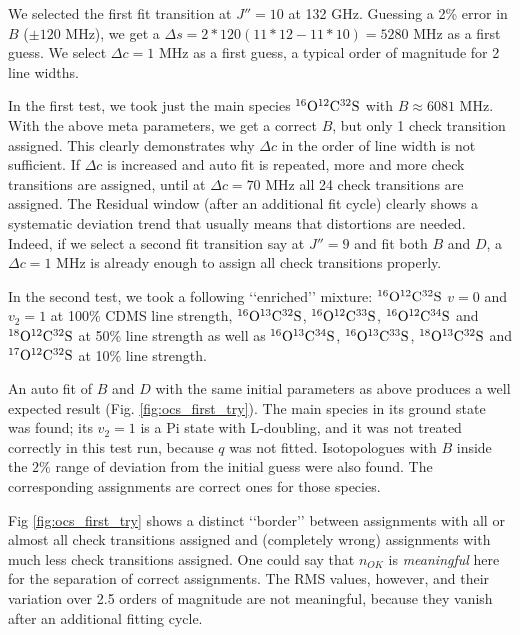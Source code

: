 \documentclass[11pt]{article}
\begin{document}
We selected the first fit transition at $J'' = 10$ at 132 GHz. Guessing a 2\% error in $B$ ($\pm 120$ MHz), we get a $\Delta s = 2*120(11*12 - 11*10) = 5280$ MHz as a first guess. We select $\Delta c = 1$ MHz as a first guess, a typical order of magnitude for 2 line widths.

In the first test, we took just the main species $\rm ^{16}O^{12}C^{32}S$ with $B \approx 6081$ MHz. With the above meta parameters, we get a correct $B$, but only 1 check transition assigned. This clearly demonstrates why $\Delta c$ in the order of line width is not sufficient. If $\Delta c$ is increased and auto fit is repeated, more and more check transitions are assigned, until at $\Delta c = 70$ MHz all 24 check transitions are assigned. The Residual window (after an additional fit cycle) clearly shows a systematic deviation trend that usually means that distortions are needed. Indeed, if we select a second fit transition say at $J'' = 9$ and fit both $B$ and $D$, a $\Delta c = 1$ MHz is already enough to assign all check transitions properly.

In the second test, we took a following \lq\lq{}enriched\rq\rq{} mixture: $\rm ^{16}O^{12}C^{32}S$ $v = 0$ and $v_2 = 1$ at 100\% CDMS line strength, 
$\rm ^{16}O^{13}C^{32}S$, $\rm ^{16}O^{12}C^{33}S$, $\rm ^{16}O^{12}C^{34}S$ and $\rm ^{18}O^{12}C^{32}S$ at 50\% line strength as well as $\rm ^{16}O^{13}C^{34}S$, $\rm ^{16}O^{13}C^{33}S$, $\rm ^{18}O^{13}C^{32}S$ and $\rm ^{17}O^{12}C^{32}S$ at 10\% line strength. 

An auto fit of $B$ and $D$ with the same initial parameters as above produces a well expected result (Fig. \ref{fig:ocs_first_try}). The main species in its ground state was found; its $v_2 = 1$ is a Pi state with L-doubling, and it was not treated correctly in this test run, because $q$ was not fitted. Isotopologues with $B$ inside the $2\%$ range of deviation from the initial guess were also found. The corresponding assignments are correct ones for those species.

Fig \ref{fig:ocs_first_try} shows a distinct \lq\lq{}border\rq\rq{} between assignments with all or almost all check transitions assigned and (completely wrong) assignments with much less check transitions assigned. One could say that $n_{OK}$ is \emph{meaningful} here for the separation of correct assignments. The RMS values, however, and their variation over 2.5 orders of magnitude are not meaningful, because they vanish after an additional fitting cycle. 
\end{document}
